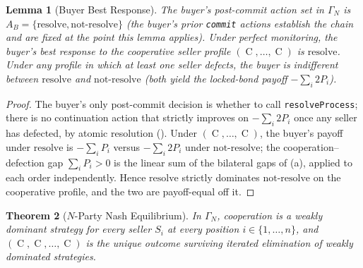\documentclass[11pt,a4paper]{article}
\newtheorem{theorem}{Theorem}[section]
\newtheorem{lemma}[theorem]{Lemma}
\theoremstyle{definition}
\theoremstyle{remark}
\newcommand{\pay}{P}           %
\DeclareMathOperator{\Coop}{C}
\begin{document}
\begin{lemma}[Buyer Best Response]
\label{lem:buyer-best-response}
The buyer's \emph{post-commit} action set in $\Gamma_N$ is
$A_B = \{\text{resolve}, \text{not-resolve}\}$ (the buyer's
prior \texttt{commit} actions establish the chain and are
fixed at the point this lemma applies). Under perfect monitoring,
the buyer's best response to the cooperative seller profile
$(\Coop, \ldots, \Coop)$ is $\text{resolve}$. Under any profile
in which at least one seller defects, the buyer is indifferent
between $\text{resolve}$ and $\text{not-resolve}$ (both yield
the locked-bond payoff $-\sum_i 2\pay_i$).
\end{lemma}

\begin{proof}
The buyer's only post-commit decision is whether to call
\texttt{resolveProcess}; there is no continuation action that
strictly improves on $-\sum_i 2\pay_i$ once any seller has
defected, by atomic resolution
(). Under $(\Coop, \ldots, \Coop)$,
the buyer's payoff under $\text{resolve}$ is $-\sum_i \pay_i$
versus $-\sum_i 2\pay_i$ under $\text{not-resolve}$; the
cooperation--defection gap $\sum_i \pay_i > 0$ is the linear
sum of the bilateral gaps of (a),
applied to each order independently. Hence $\text{resolve}$
strictly dominates $\text{not-resolve}$ on the cooperative
profile, and the two are payoff-equal off it.
\end{proof}

\begin{theorem}[$N$-Party Nash Equilibrium]
\label{thm:n-party-nash}
In $\Gamma_N$, cooperation is a weakly dominant strategy for every
seller $S_i$ at every position $i \in \{1, \ldots, n\}$, and
$(\Coop, \Coop, \ldots, \Coop)$ is the unique outcome surviving
iterated elimination of weakly dominated strategies.
\end{theorem}
\end{document}
